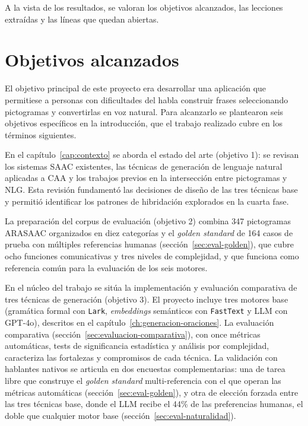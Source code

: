 A la vista de los resultados, se valoran los objetivos alcanzados, las lecciones extraídas y las líneas que quedan abiertas.

\section{Objetivos alcanzados}

El objetivo principal de este proyecto era desarrollar una aplicación que permitiese a personas con dificultades del habla construir frases seleccionando pictogramas y convertirlas en voz natural. Para alcanzarlo se plantearon seis objetivos específicos en la introducción, que el trabajo realizado cubre en los términos siguientes.

En el capítulo~\ref{cap:contexto} se aborda el estado del arte (objetivo 1): se revisan los sistemas SAAC existentes, las técnicas de generación de lenguaje natural aplicadas a CAA y los trabajos previos en la intersección entre pictogramas y NLG. Esta revisión fundamentó las decisiones de diseño de las tres técnicas base y permitió identificar los patrones de hibridación explorados en la cuarta fase.

La preparación del corpus de evaluación (objetivo 2) combina 347 pictogramas ARASAAC organizados en diez categorías y el \textit{golden standard} de 164 casos de prueba con múltiples referencias humanas (sección~\ref{sec:eval-golden}), que cubre ocho funciones comunicativas y tres niveles de complejidad, y que funciona como referencia común para la evaluación de los seis motores.

En el núcleo del trabajo se sitúa la implementación y evaluación comparativa de tres técnicas de generación (objetivo 3). El proyecto incluye tres motores base (gramática formal con \texttt{Lark}, \textit{embeddings} semánticos con \texttt{FastText} y LLM con GPT-4o), descritos en el capítulo~\ref{ch:generacion-oraciones}. La evaluación comparativa (sección~\ref{sec:evaluacion-comparativa}), con once métricas automáticas, tests de significancia estadística y análisis por complejidad, caracteriza las fortalezas y compromisos de cada técnica. La validación con hablantes nativos se articula en dos encuestas complementarias: una de tarea libre que construye el \textit{golden standard} multi-referencia con el que operan las métricas automáticas (sección~\ref{sec:eval-golden}), y otra de elección forzada entre las tres técnicas base, donde el LLM recibe el 44\% de las preferencias humanas, el doble que cualquier motor base (sección~\ref{sec:eval-naturalidad}).

